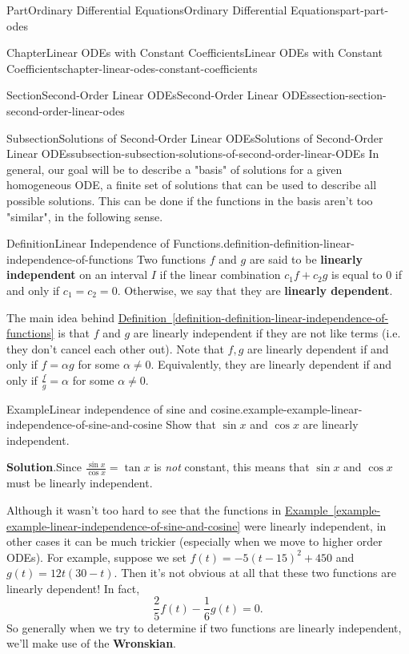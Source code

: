 \documentclass[twoside,10pt,]{book}
\newcommand{\blocktitlefont}{\relax}
\newcommand{\xreffont}{\relax}
\newcommand{\terminology}[1]{\textbf{#1}}
\numberwithin{equation}{part}
\begin{document}
\begin{partptx}{Part}{Ordinary Differential Equations}{}{Ordinary Differential Equations}{}{}{part-part-odes}
\begin{chapterptx}{Chapter}{Linear ODEs with Constant Coefficients}{}{Linear ODEs with Constant Coefficients}{}{}{chapter-linear-odes-constant-coefficients}
\begin{sectionptx}{Section}{Second-Order Linear ODEs}{}{Second-Order Linear ODEs}{}{}{section-section-second-order-linear-odes}
\begin{subsectionptx}{Subsection}{Solutions of Second-Order Linear ODEs}{}{Solutions of Second-Order Linear ODEs}{}{}{subsection-subsection-solutions-of-second-order-linear-ODEs}
In general, our goal will be to describe a "basis" of solutions for a given homogeneous ODE, a finite set of solutions that can be used to describe all possible solutions. This can be done if the functions in the basis aren't too "similar", in the following sense.%
\begin{definition}{Definition}{Linear Independence of Functions.}{definition-definition-linear-independence-of-functions}%
%
Two functions \(f\) and \(g\) are said to be \terminology{linearly independent} on an interval \(I\) if the linear combination \(c_{1}f + c_{2}g\) is equal to \(0\) if and only if \(c_{1} = c_{2} = 0\). Otherwise, we say that they are \terminology{linearly dependent}.%
\end{definition}
The main idea behind \hyperref[definition-definition-linear-independence-of-functions]{Definition~{\xreffont\ref{definition-definition-linear-independence-of-functions}}} is that \(f\) and \(g\) are linearly independent if they are not like terms (i.e. they don't cancel each other out). Note that \(f,g\) are linearly dependent if and only if \(f = \alpha g\) for some \(\alpha\neq 0\). Equivalently, they are linearly dependent if and only if \(\frac{f}{g} = \alpha\) for some \(\alpha\neq0\).%
\begin{example}{Example}{Linear independence of sine and cosine.}{example-example-linear-independence-of-sine-and-cosine}%
Show that \(\sin x\) and \(\cos x\) are linearly independent.%
\par\smallskip%
\noindent\textbf{\blocktitlefont Solution}.\hypertarget{solution-example-linear-independence-of-sine-and-cosine-c}{}\quad{}Since \(\frac{\sin x}{\cos x} = \tan x\) is \emph{not} constant, this means that \(\sin x\) and \(\cos x\) must be linearly independent.%
\end{example}
Although it wasn't too hard to see that the functions in \hyperref[example-example-linear-independence-of-sine-and-cosine]{Example~{\xreffont\ref{example-example-linear-independence-of-sine-and-cosine}}} were linearly independent, in other cases it can be much trickier (especially when we move to higher order ODEs). For example, suppose we set \(f(t) = -5(t-15)^{2} + 450\) and \(g(t) = 12t(30-t)\). Then it's not obvious at all that these two functions are linearly dependent! In fact,%
\begin{equation*}
\frac{2}{5}f(t) - \frac{1}{6}g(t) = 0.
\end{equation*}
So generally when we try to determine if two functions are linearly independent, we'll make use of the \terminology{Wronskian}.%

\end{subsectionptx}
\end{sectionptx}
\end{chapterptx}
\end{partptx}
\end{document}
